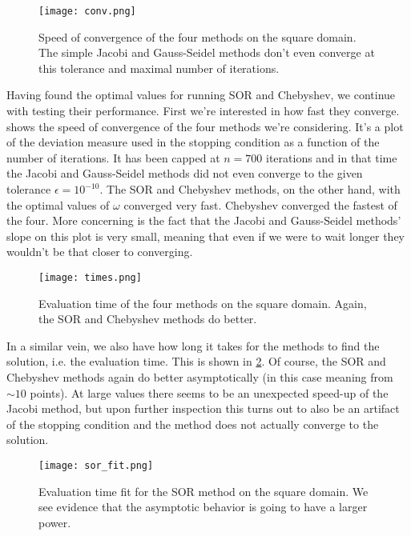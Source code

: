 \documentclass[10pt,a4paper,twocolumn]{article}
\begin{document}
\begin{figure}[!b]
    \centering
    \texttt{[image: conv.png]}
    \caption{Speed of convergence of the four methods on the square domain. The simple Jacobi and Gauss-Seidel methods don't even converge at this tolerance and maximal number of iterations.}
    \label{fig:conv}
\end{figure}

Having found the optimal values for running SOR and Chebyshev, we continue with testing their performance. First we're interested in how fast they converge.  shows the speed of convergence of the four methods we're considering. It's a plot of the deviation measure used in the stopping condition as a function of the number of iterations. It has been capped at $n=700$ iterations and in that time the Jacobi and Gauss-Seidel methods did not even converge to the given tolerance $\epsilon = 10^{-10}$. The SOR and Chebyshev methods, on the other hand, with the optimal values of $\omega$ converged very fast. Chebyshev converged the fastest of the four. More concerning is the fact that the Jacobi and Gauss-Seidel methods' slope on this plot is very small, meaning that even if we were to wait longer they wouldn't be that closer to converging.  

\begin{figure}[!h]
    \centering
    \texttt{[image: times.png]}
    \caption{Evaluation time of the four methods on the square domain. Again, the SOR and Chebyshev methods do better.}
    \label{fig:times}
\end{figure}

In a similar vein, we also have how long it takes for the methods to find the solution, i.e. the evaluation time. This is shown in \cref{fig:times}. Of course, the SOR and Chebyshev methods again do better asymptotically (in this case meaning from $\sim \!\!10$ points). At large values there seems to be an unexpected speed-up of the Jacobi method, but upon further inspection this turns out to also be an artifact of the stopping condition and the method does not actually converge to the solution.

\begin{figure}[!ht]
    \centering
    \texttt{[image: sor\_fit.png]}
    \caption{Evaluation time fit for the SOR method on the square domain. We see evidence that the asymptotic behavior is going to have a larger power.}
    \label{fig:cheb_fit}
\end{figure}
\end{document}
